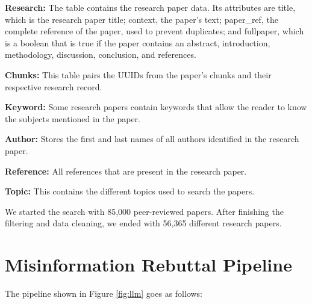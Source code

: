\begin{description}
	\item{\textbf{Research:}}  The table contains the research paper data. Its attributes are title, which is the research paper title; context, the paper’s text; paper\_ref, the complete reference of the paper, used to prevent duplicates; and fullpaper, which is a boolean that is true if the paper contains an abstract, introduction, methodology, discussion, conclusion, and references.
	\item{\textbf{Chunks:}} This table pairs the UUIDs from the paper's chunks and their respective research record.  
	\item{\textbf{Keyword:}} Some research papers contain keywords that allow the reader to know the subjects mentioned in the paper. 
	\item{\textbf{Author:}} Stores the first and last names of all authors identified in the research paper. 
	\item{\textbf{Reference:}} All references that are present in the research paper.
	\item{\textbf{Topic:}} This contains the different topics used to search the papers.

\end{description}

We started the search with 85,000 peer-reviewed papers. After finishing the filtering and data cleaning, we ended with 56,365 different research papers. 




    



\section{Misinformation Rebuttal Pipeline}

The pipeline shown in Figure \ref{fig:llm} goes as follows:

